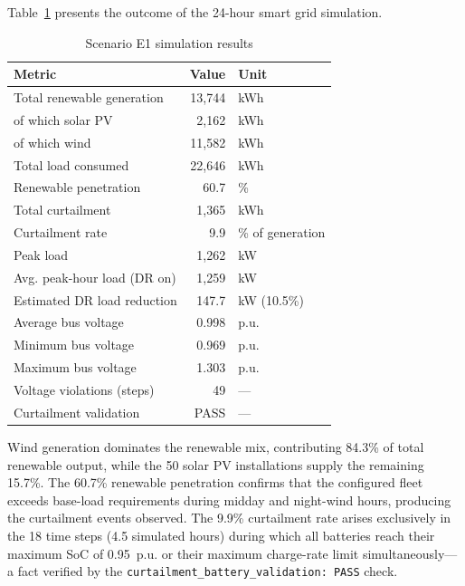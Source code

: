 Table~\ref{tab:e1_results} presents the outcome of the 24-hour smart grid simulation.

\begin{table}[h]
    \centering
    \caption{Scenario E1 simulation results}
    \label{tab:e1_results}
    \begin{tabular}{lrl}
        \toprule
        \textbf{Metric} & \textbf{Value} & \textbf{Unit} \\
        \midrule
        Total renewable generation  & 13{,}744  & kWh \\
        \quad of which solar PV     & 2{,}162   & kWh \\
        \quad of which wind         & 11{,}582  & kWh \\
        Total load consumed         & 22{,}646  & kWh \\
        Renewable penetration       & 60.7      & \% \\
        Total curtailment           & 1{,}365   & kWh \\
        Curtailment rate            & 9.9       & \% of generation \\
        Peak load                   & 1{,}262   & kW \\
        Avg. peak-hour load (DR on) & 1{,}259   & kW \\
        Estimated DR load reduction & 147.7     & kW (10.5\%) \\
        Average bus voltage         & 0.998     & p.u. \\
        Minimum bus voltage         & 0.969     & p.u. \\
        Maximum bus voltage         & 1.303     & p.u. \\
        Voltage violations (steps)  & 49        & — \\
        Curtailment validation      & PASS      & — \\
        \bottomrule
    \end{tabular}
\end{table}

Wind generation dominates the renewable mix, contributing 84.3\% of total renewable output, while the 50 solar PV installations supply the remaining 15.7\%. The 60.7\% renewable penetration confirms that the configured fleet exceeds base-load requirements during midday and night-wind hours, producing the curtailment events observed. The 9.9\% curtailment rate arises exclusively in the 18 time steps (4.5 simulated hours) during which all batteries reach their maximum SoC of 0.95~p.u. or their maximum charge-rate limit simultaneously---a fact verified by the \texttt{curtailment\_battery\_validation: PASS} check.

